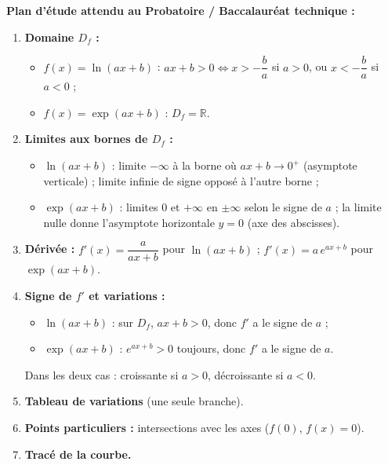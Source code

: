 \documentclass[11pt]{article}
\begin{document}
\begin{methode}
\textbf{Plan d'étude attendu au Probatoire / Baccalauréat technique :}
\begin{enumerate}
    \item \textbf{Domaine $D_f$ :}
    \begin{itemize}
        \item $f(x)=\ln(ax+b)$ : $ax+b > 0 \iff x > -\dfrac{b}{a}$ si $a>0$, ou $x < -\dfrac{b}{a}$ si $a<0$ ;
        \item $f(x)=\exp(ax+b)$ : $D_f = \mathbb{R}$.
    \end{itemize}
    \item \textbf{Limites aux bornes de $D_f$ :}
    \begin{itemize}
        \item $\ln(ax+b)$ : limite $-\infty$ à la borne où $ax+b\to 0^+$ (asymptote verticale) ; limite infinie de signe opposé à l'autre borne ;
        \item $\exp(ax+b)$ : limites $0$ et $+\infty$ en $\pm\infty$ selon le signe de $a$ ; la limite nulle donne l'asymptote horizontale $y=0$ (axe des abscisses).
    \end{itemize}
    \item \textbf{Dérivée :} $f'(x) = \dfrac{a}{ax+b}$ pour $\ln(ax+b)$ ; $f'(x) = a\,e^{ax+b}$ pour $\exp(ax+b)$.
    \item \textbf{Signe de $f'$ et variations :}
    \begin{itemize}
        \item $\ln(ax+b)$ : sur $D_f$, $ax+b>0$, donc $f'$ a le signe de $a$ ;
        \item $\exp(ax+b)$ : $e^{ax+b}>0$ toujours, donc $f'$ a le signe de $a$.
    \end{itemize}
    Dans les deux cas : croissante si $a>0$, décroissante si $a<0$.
    \item \textbf{Tableau de variations} (une seule branche).
    \item \textbf{Points particuliers :} intersections avec les axes ($f(0)$, $f(x)=0$).
    \item \textbf{Tracé de la courbe.}
\end{enumerate}
\end{methode}
\end{document}

